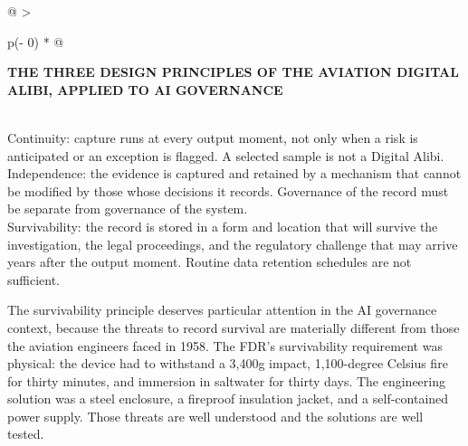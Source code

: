 \begin{longtable}[]{@{}
  >{\raggedright\arraybackslash}p{(\columnwidth - 0\tabcolsep) * }@{}}
\toprule\noalign{}
\begin{minipage}[b]{\linewidth}\raggedright
\textbf{THE THREE DESIGN PRINCIPLES OF THE AVIATION DIGITAL ALIBI, APPLIED TO AI GOVERNANCE}
\end{minipage} \\
\midrule\noalign{}
\endhead
\bottomrule\noalign{}
\endlastfoot
Continuity: capture runs at every output moment, not only when a risk is anticipated or an exception is flagged. A selected sample is not a Digital Alibi. \\
Independence: the evidence is captured and retained by a mechanism that cannot be modified by those whose decisions it records. Governance of the record must be separate from governance of the system. \\
Survivability: the record is stored in a form and location that will survive the investigation, the legal proceedings, and the regulatory challenge that may arrive years after the output moment. Routine data retention schedules are not sufficient. \\
\end{longtable}

The survivability principle deserves particular attention in the AI governance context, because the threats to record survival are materially different from those the aviation engineers faced in 1958. The FDR's survivability requirement was physical: the device had to withstand a 3,400g impact, 1,100-degree Celsius fire for thirty minutes, and immersion in saltwater for thirty days. The engineering solution was a steel enclosure, a fireproof insulation jacket, and a self-contained power supply. Those threats are well understood and the solutions are well tested.

